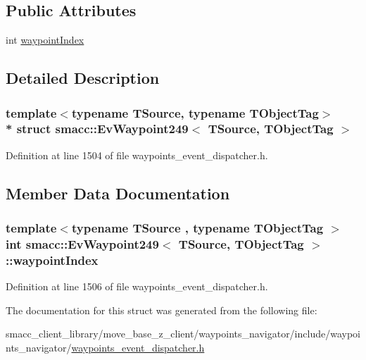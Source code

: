\subsection*{Public Attributes}
\begin{DoxyCompactItemize}
\item 
int \hyperlink{structsmacc_1_1EvWaypoint249_a17bf6e9ff1d53f63d17a7086fb92ac6d}{waypoint\+Index}
\end{DoxyCompactItemize}


\subsection{Detailed Description}
\subsubsection*{template$<$typename T\+Source, typename T\+Object\+Tag$>$\\*
struct smacc\+::\+Ev\+Waypoint249$<$ T\+Source, T\+Object\+Tag $>$}



Definition at line 1504 of file waypoints\+\_\+event\+\_\+dispatcher.\+h.



\subsection{Member Data Documentation}
\subsubsection[{\texorpdfstring{waypoint\+Index}{waypointIndex}}]{\setlength{\rightskip}{0pt plus 5cm}template$<$typename T\+Source , typename T\+Object\+Tag $>$ int {\bf smacc\+::\+Ev\+Waypoint249}$<$ T\+Source, T\+Object\+Tag $>$\+::waypoint\+Index}\hypertarget{structsmacc_1_1EvWaypoint249_a17bf6e9ff1d53f63d17a7086fb92ac6d}{}\label{structsmacc_1_1EvWaypoint249_a17bf6e9ff1d53f63d17a7086fb92ac6d}


Definition at line 1506 of file waypoints\+\_\+event\+\_\+dispatcher.\+h.



The documentation for this struct was generated from the following file\+:\begin{DoxyCompactItemize}
\item 
smacc\+\_\+client\+\_\+library/move\+\_\+base\+\_\+z\+\_\+client/waypoints\+\_\+navigator/include/waypoints\+\_\+navigator/\hyperlink{waypoints__event__dispatcher_8h}{waypoints\+\_\+event\+\_\+dispatcher.\+h}\end{DoxyCompactItemize}
